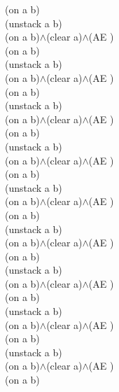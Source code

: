 {{(on a b)\\
(unstack a b)\\
(on a b)$\wedge$(clear a)$\wedge$(AE )\\
(on a b)\\
(unstack a b)\\
(on a b)$\wedge$(clear a)$\wedge$(AE )\\
(on a b)\\
(unstack a b)\\
(on a b)$\wedge$(clear a)$\wedge$(AE )\\
(on a b)\\
(unstack a b)\\
(on a b)$\wedge$(clear a)$\wedge$(AE )\\
(on a b)\\
(unstack a b)\\
(on a b)$\wedge$(clear a)$\wedge$(AE )\\
(on a b)\\
(unstack a b)\\
(on a b)$\wedge$(clear a)$\wedge$(AE )\\
(on a b)\\
(unstack a b)\\
(on a b)$\wedge$(clear a)$\wedge$(AE )\\
(on a b)\\
(unstack a b)\\
(on a b)$\wedge$(clear a)$\wedge$(AE )\\
(on a b)\\
(unstack a b)\\
(on a b)$\wedge$(clear a)$\wedge$(AE )\\
(on a b)\\
}%
}

